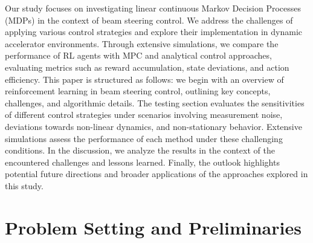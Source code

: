 \documentclass[journal,article,submit,pdftex,moreauthors]{Definitions/mdpi}
\begin{document}
Our study focuses on investigating linear continuous Markov Decision Processes (MDPs) in the context of beam steering control. We address the challenges of applying various control strategies and explore their implementation in dynamic accelerator environments. Through extensive simulations, we compare the performance of RL agents with MPC and analytical control approaches, evaluating metrics such as reward accumulation, state deviations, and action efficiency.
This paper is structured as follows: we begin with an overview of reinforcement learning in beam steering control, outlining key concepts, challenges, and algorithmic details. The testing section evaluates the sensitivities of different control strategies under scenarios involving measurement noise, deviations towards non-linear dynamics, and non-stationary behavior. Extensive simulations assess the performance of each method under these challenging conditions. In the discussion, we analyze the results in the context of the encountered challenges and lessons learned. Finally, the outlook highlights potential future directions and broader applications of the approaches explored in this study.






\section{Problem Setting and Preliminaries}
\end{document}
